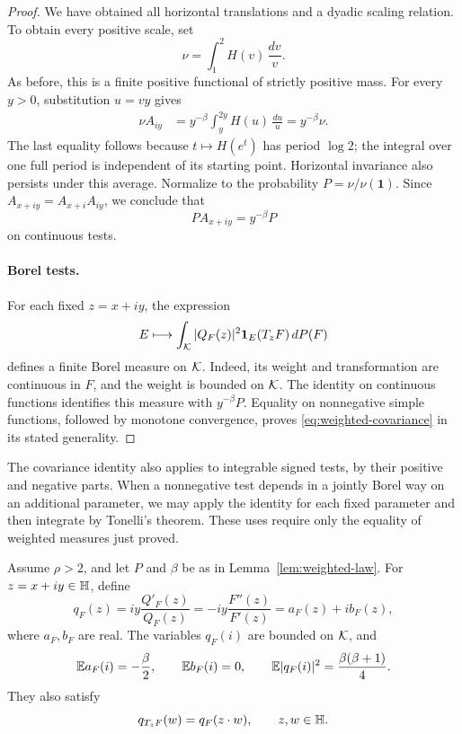 \begin{proof}
We have obtained all horizontal translations and a dyadic scaling relation.
To obtain every positive scale, set
\[
 \nu=\int_1^2 H(v)\,\frac{dv}{v}.
\]
As before, this is a finite positive functional of strictly positive mass.
For every $y>0$, substitution $u=vy$ gives
\begin{align*}
 \nu A_{iy}
 &=y^{-\beta}\int_y^{2y}H(u)\,\frac{du}{u}
  =y^{-\beta}\nu.
\end{align*}
The last equality follows because $t\mapsto H(e^t)$ has period $\log2$;
the integral over one full period is independent of its starting point.
Horizontal invariance also persists under this average.  Normalize to the
probability $P=\nu/\nu(\mathbf 1)$.  Since
$A_{x+iy}=A_{x+i}A_{iy}$, we conclude that
\[
 PA_{x+iy}=y^{-\beta}P
\]
on continuous tests.

\paragraph{Borel tests.}
For each fixed $z=x+iy$, the expression
\[
 E\longmapsto\int_{\mathcal K}|Q_F(z)|^2
                \mathbf 1_E(T_zF)\,d P(F)
\]
defines a finite Borel measure on $\mathcal K$.  Indeed, its weight and
transformation are continuous in $F$, and the weight is bounded on $\mathcal K$.
The identity on continuous functions identifies this measure with
$y^{-\beta}P$.  Equality on nonnegative simple functions, followed by
monotone convergence, proves \eqref{eq:weighted-covariance} in its stated
generality.
\end{proof}

The covariance identity also applies to integrable signed tests, by their
positive and negative parts.  When a nonnegative test depends in a jointly
Borel way on an additional parameter, we may apply the identity for each
fixed parameter and then integrate by Tonelli's theorem.  These uses require
only the equality of weighted measures just proved.

\begin{lemma}
\label{lem:law-moments}
Assume $\rho>2$, and let $P$ and $\beta$ be as in
Lemma~\ref{lem:weighted-law}.  For $z=x+iy\in\mathbb H$, define
\begin{equation}
 q_F(z)=iy\frac{Q'_F(z)}{Q_F(z)}
       =-iy\frac{F''(z)}{F'(z)}
       =a_F(z)+ib_F(z),
 \label{eq:logarithmic-derivative-variable}
\end{equation}
where $a_F,b_F$ are real.  The variables $q_F(i)$ are bounded on $\mathcal K$, and
\begin{equation}
 \mathbb E a_F(i)=-\frac\beta2,
 \qquad \mathbb E b_F(i)=0,
 \qquad \mathbb E|q_F(i)|^2=\frac{\beta(\beta+1)}4.
 \label{eq:law-moments}
\end{equation}
They also satisfy
\begin{equation}
 q_{T_zF}(w)=q_F(z\cdot w),\qquad z,w\in\mathbb H.
 \label{eq:q-affine-covariance}
\end{equation}
\end{lemma}

